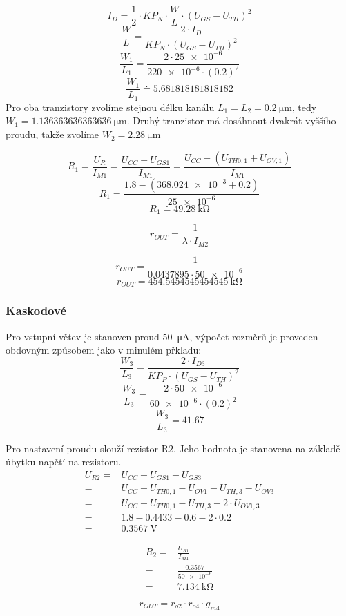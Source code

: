 \[
    I_D=\frac{1}{2} \cdot K P_N \cdot \frac{W}{L} \cdot\left(U_{G S}-U_{T H}\right)^2
\]
\[
    \frac{W}{L}=\frac{2\cdot I_{D}}{KP_{N}\cdot (U_{GS} -U_{TH})^2 } 
\]
\[
    \frac{W_{1} }{L_{1} }=\frac{2\cdot \num{25e-6}}{\num{220e-6}\cdot (\num{0.2})^2 } 
\]
\[
    \frac{W_{1} }{L_{1} }\doteq \num[round-mode=places,round-precision=2]{5.681818181818182} 
\]
Pro oba tranzistory zvolíme stejnou délku kanálu \(L_{1}=L_{2} = \qty{0.2}{\micro\meter}\), tedy \(W_{1} =\qty[round-mode=places,round-precision=2]{1,136363636363636}{\micro\meter}\). Druhý tranzistor má dosáhnout dvakrát vyššího proudu, takže zvolíme \(W_{2} =\qty{2.28}{\micro\meter}\)  

\[
    R_1=\frac{U_R}{I_{M 1}}=\frac{U_{C C}-U_{G S 1}}{I_{M 1}}=\frac{U_{C C}-\left(U_{T H 0,1}+U_{O V, 1}\right)}{I_{M 1}}
\]
\[
    R_1=\frac{\num{1.8}-\left(\num{368,024e-3}+\num{0.2}\right)}{\num{25e-6}}
\]
\[
    R_{1} \doteq \qty{49,28}{\kilo\ohm}
\]


\[
    r_{O U T}=\frac{1}{\lambda \cdot I_{M 2}}
\]

\[
    r_{O U T}=\frac{1}{\num[round-mode=places,round-precision=3]{0,0437895} \cdot \num{50e-6}}
\]
\[
    r_{O U T}=\qty[round-mode=places,round-precision=3]{454,5454545454545}{\kilo\ohm}
\]



\subsubsection{Kaskodové}
Pro vstupní větev je stanoven proud \qty{50}{\micro\ampere}, výpočet rozměrů je proveden obdovným způsobem jako v minulém přkladu:
\[
    \frac{W_3}{L_3}=\frac{2\cdot I_{D3}}{KP_{P}\cdot (U_{GS} -U_{TH})^2 } 
\]
\[
    \frac{W_3}{L_3}=\frac{2\cdot \num{50e-6}}{\num{60e-6} \cdot (\num{0.2})^2 } 
\]
\[
    \frac{W_3}{L_3}=\num{41,67}
\]

Pro nastavení proudu slouží rezistor R2. Jeho hodnota je stanovena na základě úbytku napětí na rezistoru.
\begin{align*}
    U_{R 2}=&U_{C C}-U_{G S 1}-U_{G S 3} \\
           =&U_{C C}-U_{T H 0,1}- U_{O V 1}-U_{T H, 3}-U_{O V 3} \\
           =&U_{C C}-U_{T H 0,1}-U_{T H, 3}-2 \cdot U_{O V 1,3} \\
           =&\num{1.8}-\num{0.4433}-\num{0.6}-2 \cdot \num{0.2} \\
           =&\qty{0.3567}{\volt}
\end{align*}

\begin{align*}
    R_{2} =& \frac{U_{R1}}{I_{M1} } \\
          =& \frac{\num{0.3567}}{\num{50e-6}} \\
          =& \qty{7.134}{\kilo\ohm}
\end{align*}

\[
    r_{OUT} =r_{o2} \cdot r_{o4} \cdot g_{m4} 
\]